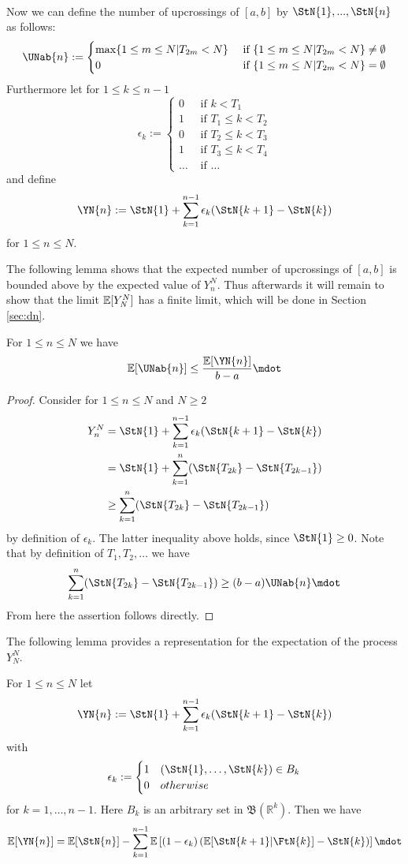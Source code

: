 \begin{defn}
\begin{align*}
	\end{align*}
	Now we can define the number of upcrossings of $[a, b]$ by $\StN{1}, ..., \StN{n}$ as follows:
	\[
	\UNab{n} :=\begin{cases}  
	\max\{1\leq m \leq N | T_{2m} < N\} & \textrm{ if } \{1\leq m \leq N | T_{2m} < N\}\neq \emptyset\\
	0 &  \textrm{ if } \{1\leq m \leq N | T_{2m} < N\} = \emptyset
	\end{cases}
	\]
	Furthermore let for $1\leq k\leq n-1$
	\[ \epsilon_k := \begin{cases} 
	0 & \textrm{ if } k < T_1 \\
	1 & \textrm{ if } T_1 \leq k < T_2\\
	0 & \textrm{ if } T_2 \leq k < T_3\\
	1 & \textrm{ if } T_3 \leq k < T_4\\
	\dots & \textrm{ if } \dots
	\end{cases}
	\]
	and define
	$$\YN{n} := \StN{1} + \sum\limits_{k=1}^{n-1} \epsilon_k (\StN{k+1}-\StN{k})$$
	for $1\leq n\leq N$. 	
\end{defn}
%
The following lemma shows that the expected number of upcrossings of $[a,b]$ is bounded above by the expected value of $Y_n^N$. Thus afterwards it will remain to show that the limit $\mathbb{E}[Y_N^N]$ has a finite limit, which will be done in Section \ref{sec:dn}.
\begin{lemma}
	For $1\leq n\leq N$ we have
	$$\E[\UNab{n}]\leq \frac{\E[\YN{n}]}{b-a}\mdot$$
	\label{lem:upcrossings_yn}
\end{lemma}
%
\begin{proof}
	Consider for $1\leq n\leq N$ and $N\geq 2$
	\begin{align*}
	Y_n^N &= \StN{1} + \sum_{k=1}^{n-1}\epsilon_k(\StN{k+1}-\StN{k})\\
	&= \StN{1} + \sum_{k=1}^{n}(\StN{T_{2k}}-\StN{T_{2k-1}})\\
	&\geq \sum_{k=1}^{n}(\StN{T_{2k}}-\StN{T_{2k-1}})
	\end{align*}
	by definition of $\epsilon_k$. The latter inequality above holds, since $\StN{1}\geq 0$. Note that by definition of $T_1, T_2, \dots$ we have
	$$\sum_{k=1}^{n}(\StN{T_{2k}}-\StN{T_{2k-1}}) \geq (b-a)\UNab{n}\mdot$$
	From here the assertion follows directly.
\end{proof}
%
The following lemma provides a representation for the expectation of the process $Y_N^N$.
\begin{lemma}
	\label{lem:optional_skipping}
	For $1\leq n\leq N$ let
	$$\YN{n} := \StN{1} + \sum_{k=1}^{n-1} \epsilon_k (\StN{k+1} - \StN{k}) $$
	with
	\[ \epsilon_k := \begin{cases} 
		1 & (\StN{1},\dots,\StN{k})\in B_k \\
		0 & otherwise 
	\end{cases}
	\]
	for $k=1,\dots, n-1$. Here $B_k$ is an arbitrary set in $\mathfrak{B}(\mathbb{R}^k)$. Then we have
	\begin{equation}
		\E[\YN{n}] = \E[\StN{n}] - \sum_{k=1}^{n-1}\E\left[(1-\epsilon_k)\left(\E[\StN{k+1}|\FtN{k}]  - \StN{k} \right)\right]\mdot
		\label{eq:ineq_yk}
	\end{equation}
\end{lemma}
